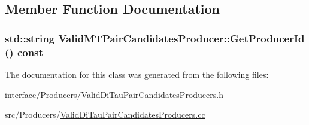 \subsection{Member Function Documentation}
\hypertarget{classValidMTPairCandidatesProducer_ac644278c7d0b1cb740cae7eff383aa0a}{
\subsubsection[{GetProducerId}]{\setlength{\rightskip}{0pt plus 5cm}std::string ValidMTPairCandidatesProducer::GetProducerId () const}}
\label{classValidMTPairCandidatesProducer_ac644278c7d0b1cb740cae7eff383aa0a}


The documentation for this class was generated from the following files:\begin{DoxyCompactItemize}
\item 
interface/Producers/\hyperlink{ValidDiTauPairCandidatesProducers_8h}{ValidDiTauPairCandidatesProducers.h}\item 
src/Producers/\hyperlink{ValidDiTauPairCandidatesProducers_8cc}{ValidDiTauPairCandidatesProducers.cc}\end{DoxyCompactItemize}
